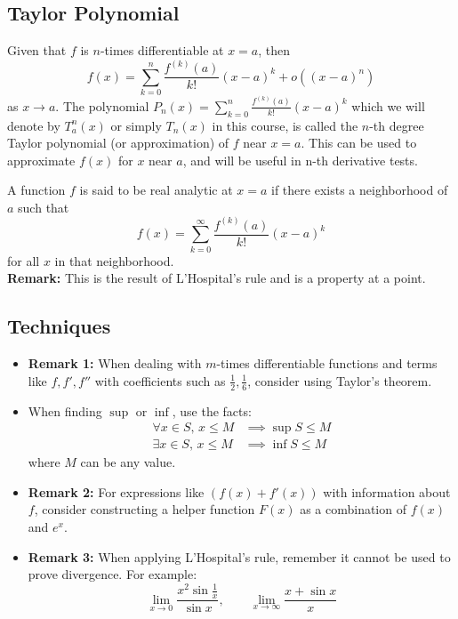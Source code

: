 \documentclass[a4paper,10pt]{article}
\begin{document}
\subsection{Taylor Polynomial}
Given that $f$ is $n$-times differentiable at $x = a$, then
\[
    f(x) = \sum_{k=0}^n \frac{f^{(k)}(a)}{k!}(x - a)^k + o((x-a)^n)
\]
as $x \to a$.
The polynomial
\(
    P_n(x) = \sum_{k=0}^n \frac{f^{(k)}(a)}{k!}(x - a)^k
\)
which we will denote by $T_a^n(x)$ or simply $T_n(x)$ in this course, is called the $n$-th degree Taylor polynomial (or approximation) of $f$ near $x = a$.
This can be used to approximate $f(x)$ for $x$ near $a$, and will be useful in n-th derivative tests.

\noindent A function $f$ is said to be real analytic at $x = a$ if there exists a neighborhood of $a$ such that
\[
    f(x) = \sum_{k=0}^\infty \frac{f^{(k)}(a)}{k!}(x - a)^k
\]
for all $x$ in that neighborhood.\\
\textbf{Remark:} This is the result of L'Hospital's rule and is a property at a point.

\subsection{Techniques}
\begin{itemize}
    \item \textbf{Remark 1:} When dealing with $m$-times differentiable functions and terms like $f, f', f''$ with coefficients such as $\frac{1}{2}, \frac{1}{6}$, consider using Taylor's theorem.
    \item When finding $\sup$ or $\inf$, use the facts:
    \begin{align*}
        \forall x\in S,\, x \leq M &\implies \sup S \leq M\\
        \exists x\in S,\, x \leq M &\implies \inf S \leq M
    \end{align*}
    where $M$ can be any value.
    \item \textbf{Remark 2:} For expressions like $(f(x) + f'(x))$ with information about $f$, consider constructing a helper function $F(x)$ as a combination of $f(x)$ and $e^x$.
    \item \textbf{Remark 3:} When applying L'Hospital's rule, remember it cannot be used to prove divergence. For example:
    \[
        \lim_{x\to 0}\frac{x^2\sin\frac{1}{x}}{\sin x}, \qquad \lim_{x\to\infty}\frac{x + \sin x}{x}
    \]
\end{itemize}
\end{document}
